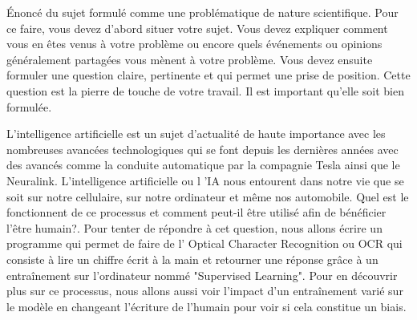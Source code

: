Énoncé du sujet formulé comme une problématique de nature scientifique. Pour ce faire, vous devez
d’abord situer votre sujet. Vous devez expliquer comment vous en êtes venus à votre problème ou encore
quels événements ou opinions généralement partagées vous mènent à votre problème. Vous devez ensuite
formuler une question claire, pertinente et qui permet une prise de position. Cette question est la pierre
de touche de votre travail. Il est important qu’elle soit bien formulée. 

L'intelligence artificielle est un sujet d'actualité de haute importance avec les nombreuses avancées 
technologiques qui se font depuis les dernières années avec des avancés comme la conduite automatique par la compagnie Tesla ainsi que le Neuralink. L'intelligence artificielle ou l 'IA nous entourent dans notre vie que se soit sur notre cellulaire, sur notre ordinateur
et même nos automobile. Quel est le fonctionnent de ce processus et comment peut-il être utilisé afin de bénéficier l’être humain?. Pour tenter de répondre à cet question, nous allons écrire un programme qui permet de faire de l' Optical Character Recognition ou OCR qui consiste à lire un chiffre écrit à la main et retourner une réponse grâce à un entraînement sur l'ordinateur nommé "Supervised Learning". Pour en découvrir plus sur ce processus, nous allons aussi voir l'impact d'un entraînement varié sur le modèle en changeant l'écriture de l'humain pour voir si cela constitue un biais.


